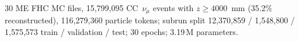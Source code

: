 30 ME FHC MC files, 15{,}799{,}095 CC~$\nu_\mu$ events with $z \ge 4000$~mm (35.2\% reconstructed), 116{,}279{,}360 particle tokens; subrun split 12{,}370{,}859 / 1{,}548{,}800 / 1{,}575{,}573 train / validation / test; 30 epochs; 3.19\,M parameters.
